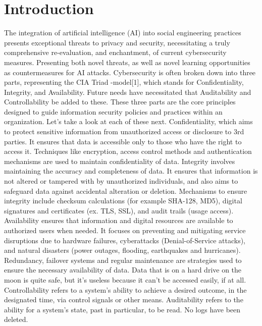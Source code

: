 \chapter{Introduction\label{intro}}

The integration of artificial intelligence (AI) into social engineering practices presents exceptional threats to privacy and security, necessitating a truly comprehensive re-evaluation, and enchantment, of current cybersecurity measures. Presenting both novel threats, as well as novel learning opportunities as countermeasures for AI attacks.
Cybersecurity is often broken down into three parts, representing the CIA Triad -model[1], which stands for Confidentiality, Integrity, and Availability. Future needs have necessitated that Auditability and Controllability be added to these. These three parts are the core principles designed to guide information security policies and practices within an organization. Let’s take a look at each of these next.
Confidentiality, which aims to protect sensitive information from unauthorized access or disclosure to 3rd parties. It ensures that data is accessible only to those who have the right to access it. Techniques like encryption, access control methods and authentication mechanisms are used to maintain confidentiality of data.
Integrity involves maintaining the accuracy and completeness of data. It ensures that information is not altered or tampered with by unauthorized individuals, and also aims to safeguard data against accidental alteration or deletion. Mechanisms to ensure integrity include checksum calculations (for example SHA-128, MD5), digital signatures and certificates (ex. TLS, SSL), and audit trails (usage access).
Availability ensures that information and digital resources are available to authorized users when needed. It focuses on preventing and mitigating service disruptions due to hardware failures, cyberattacks (Denial-of-Service attacks), and natural disasters (power outages, flooding, earthquakes and hurricanes). Redundancy, failover systems and regular maintenance are strategies used to ensure the necessary availability of data. Data that is on a hard drive on the moon is quite safe, but it’s useless because it can’t be accessed easily, if at all.
Controllability refers to a system’s ability to achieve a desired outcome, in the designated time, via control signals or other means.
Auditability refers to the ability for a system’s state, past in particular, to be read. No logs have been deleted.

